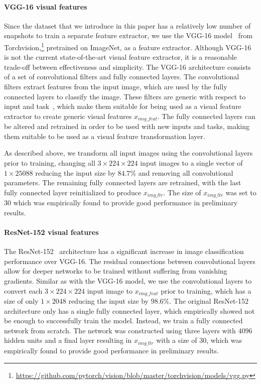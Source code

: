 \paragraph{VGG-16 visual features}
Since the \datasetname{} data\-set that we introduce in this paper has a relatively low number of snapshots to train a separate feature extractor, we use the VGG-16 model~\cite{simonyan2014very} from Torchvision,\footnote{\url{https://github.com/pytorch/vision/blob/master/torchvision/models/vgg.py}} pretrained on ImageNet, as a feature extractor. 
Although VGG-16 is not the current state-of-the-art visual feature extractor, it is a reasonable trade-off between effectiveness and simplicity.
The VGG-16 architecture consists of a set of convolutional filters and fully connected layers. 
The convolutional filters extract features from the input image, which are used by the fully connected layers to classify the image. 
These filters are generic with respect to input and task~\citep{donahue2014decaf}, which make them suitable for being used as a visual feature extractor to create generic visual features $x_{img\_feat}$. The fully connected layers can be altered and retrained in order to be used with new inputs and tasks, making them suitable to be used as a visual feature transformation layer.

As described above, we transform all input images using the convolutional layers prior to training, changing all $3\times224\times224$ input images to a single vector of $1\times25088$ reducing the input size by $84.7\%$ and removing all convolutional parameters. The remaining fully connected layers are retrained, with the last fully connected layer reinitialized to produce $x_{img\_ltr}$. The size of $x_{img\_ltr}$ was set to $30$ which was empirically found to provide good performance in preliminary results.


\paragraph{ResNet-152 visual features}
The ResNet-152~\cite{he2016deep} architecture has a significant increase in image classification performance over VGG-16. The residual connections between convolutional layers allow for deeper networks to be trained without suffering from vanishing gradients. Similar as with the VGG-16 model, we use the convolutional layers to convert each $3\times224\times224$ input image to $x_{img\_feat}$ prior to training, which has a size of only $1\times2048$ reducing the input size by $98.6\%$. The original ResNet-152 architecture only has a single fully connected layer, which empirically showed not be enough to successfully train the model. Instead, we train a fully connected network from scratch. The network was constructed using three layers with $4096$ hidden units and a final layer resulting in $x_{img\_ltr}$ with a size of $30$, which was empirically found to provide good performance in preliminary results.


